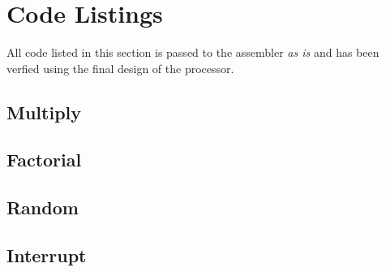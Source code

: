 

\section{Code Listings}
All code listed in this section is passed to the assembler \emph{as is} and has been verfied using the final design of the processor.
\subsection{Multiply}
\label{sec:multiply_appendix}

\subsection{Factorial}
\label{sec:factorial_appendix}

\subsection{Random}
\label{sec:random_appendix}

\subsection{Interrupt}
\label{sec:interrupt_appendix}


